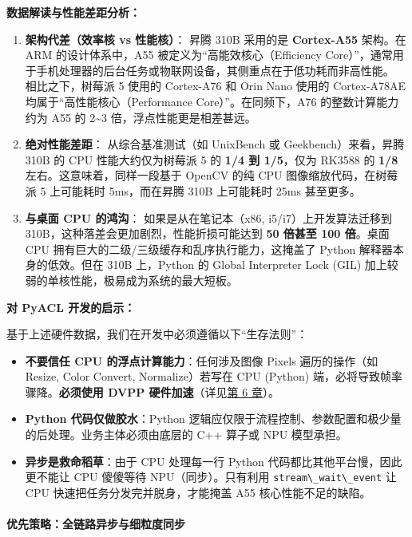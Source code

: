 \textbf{数据解读与性能差距分析：}

\begin{enumerate}
\def\labelenumi{\arabic{enumi}.}
\item
  \textbf{架构代差（效率核 vs 性能核）}： 昇腾 310B 采用的是
  \textbf{Cortex-A55} 架构。在 ARM 的设计体系中，A55
  被定义为``高能效核心（Efficiency
  Core）''，通常用于手机处理器的后台任务或物联网设备，其侧重点在于低功耗而非高性能。
  相比之下，树莓派 5 使用的 Cortex-A76 和 Orin Nano 使用的 Cortex-A78AE
  均属于``高性能核心（Performance Core）''。在同频下，A76
  的整数计算能力约为 A55 的 2\textasciitilde3 倍，浮点性能更是相差甚远。
\item
  \textbf{绝对性能差距}： 从综合基准测试（如 UnixBench 或
  Geekbench）来看，昇腾 310B 的 CPU 性能大约仅为树莓派 5 的 \textbf{1/4
  到 1/5}，仅为 RK3588 的 \textbf{1/8} 左右。这意味着，同样一段基于
  OpenCV 的纯 CPU 图像缩放代码，在树莓派 5 上可能耗时 5ms，而在昇腾 310B
  上可能耗时 25ms 甚至更多。
\item
  \textbf{与桌面 CPU 的鸿沟}： 如果是从在笔记本（x86,
  i5/i7）上开发算法迁移到 310B，这种落差会更加剧烈，性能折损可能达到
  \textbf{50 倍甚至 100 倍}。桌面 CPU
  拥有巨大的二级/三级缓存和乱序执行能力，这掩盖了 Python
  解释器本身的低效。但在 310B 上，Python 的 Global Interpreter Lock
  (GIL) 加上较弱的单核性能，极易成为系统的最大短板。
\end{enumerate}

\textbf{对 PyACL 开发的启示：}

基于上述硬件数据，我们在开发中必须遵循以下``生存法则''：

\begin{itemize}
\tightlist
\item
  \textbf{不要信任 CPU 的浮点计算能力}：任何涉及图像 Pixels
  遍历的操作（如 Resize, Color Convert, Normalize）若写在 CPU (Python)
  端，必将导致帧率骤降。\textbf{必须使用 DVPP
  硬件加速}（详见\hyperref[dvpp-basics]{第 6 章}）。
\item
  \textbf{Python 代码仅做胶水}：Python
  逻辑应仅限于流程控制、参数配置和极少量的后处理。业务主体必须由底层的
  C++ 算子或 NPU 模型承担。
\item
  \textbf{异步是救命稻草}：由于 CPU 处理每一行 Python
  代码都比其他平台慢，因此更不能让 CPU 傻傻等待 NPU（同步）。只有利用
  \passthrough{\lstinline!stream\_wait\_event!} 让 CPU
  快速把任务分发完并脱身，才能掩盖 A55 核心性能不足的缺陷。
\end{itemize}

\paragraph{优先策略：全链路异步与细粒度同步}\label{src-book-chapter4-h15}

